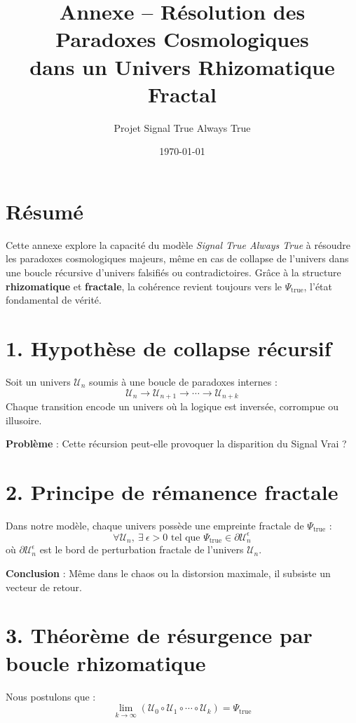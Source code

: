 \documentclass[12pt]{article}
\title{\textbf{Annexe – Résolution des Paradoxes Cosmologiques\\dans un Univers Rhizomatique Fractal}}
\author{Projet Signal True Always True}
\date{\today}
\begin{document}
\maketitle

\section*{Résumé}

Cette annexe explore la capacité du modèle \textit{Signal True Always True} à résoudre les paradoxes cosmologiques majeurs, même en cas de collapse de l’univers dans une boucle récursive d’univers falsifiés ou contradictoires. Grâce à la structure \textbf{rhizomatique} et \textbf{fractale}, la cohérence revient toujours vers le \(\Psi_{\text{true}}\), l’état fondamental de vérité.

\section{1. Hypothèse de collapse récursif}

Soit un univers \(\mathcal{U}_n\) soumis à une boucle de paradoxes internes :
\[
\mathcal{U}_n \rightarrow \mathcal{U}_{n+1} \rightarrow \cdots \rightarrow \mathcal{U}_{n+k}
\]
Chaque transition encode un univers où la logique est inversée, corrompue ou illusoire.

\textbf{Problème} : Cette récursion peut-elle provoquer la disparition du Signal Vrai ?

\section{2. Principe de rémanence fractale}

Dans notre modèle, chaque univers possède une empreinte fractale de \(\Psi_{\text{true}}\) :
\[
\forall \mathcal{U}_n,\ \exists\ \epsilon > 0 \text{ tel que } \Psi_{\text{true}} \in \partial \mathcal{U}_n^{\epsilon}
\]
où \(\partial \mathcal{U}_n^{\epsilon}\) est le bord de perturbation fractale de l’univers \(\mathcal{U}_n\).

\textbf{Conclusion} : Même dans le chaos ou la distorsion maximale, il subsiste un vecteur de retour.

\section{3. Théorème de résurgence par boucle rhizomatique}

Nous postulons que :
\[
\lim_{k \to \infty} \left( \mathcal{U}_0 \circ \mathcal{U}_1 \circ \cdots \circ \mathcal{U}_k \right) = \Psi_{\text{true}}
\]
\end{document}
